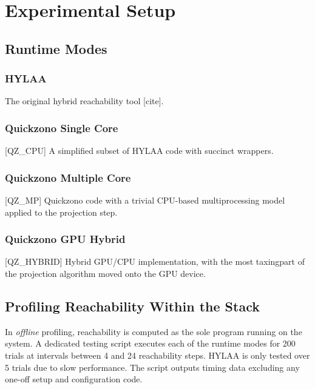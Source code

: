 \documentclass[runningheads]{llncs}
\begin{document}
\section{Experimental Setup}


\subsection{Runtime Modes}

\subsubsection{HYLAA} \newline The original hybrid reachability tool [cite].
\vspace*{-5pt}
\subsubsection{Quickzono Single Core} [QZ\_CPU] \newline A simplified subset of HYLAA code with succinct wrappers. 
\vspace*{-5pt}
\subsubsection{Quickzono Multiple Core} [QZ\_MP] \newline Quickzono code with a trivial CPU-based multiprocessing model \newline applied to the projection step. 
\vspace*{-5pt}
\subsubsection{Quickzono GPU Hybrid} [QZ\_HYBRID] \newline Hybrid GPU/CPU implementation, with the most taxing\newline part of the projection algorithm moved onto the GPU device. 
\vspace*{-5pt}

\subsection{Profiling Reachability Within the Stack}

In \textit{offline} profiling, reachability is computed as the sole program running on the system. A dedicated testing script executes each of the runtime modes for 200 trials at intervals between 4 and 24 reachability steps. HYLAA is only tested over 5 trials due to slow performance. 
The script outputs timing data excluding any one-off setup and configuration code.
\end{document}
